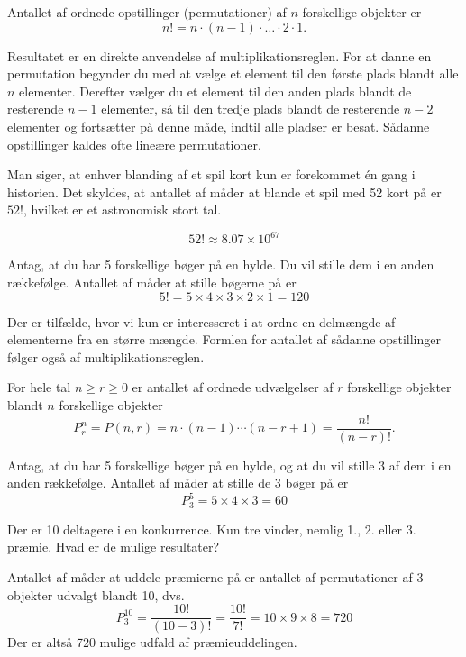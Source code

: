 \begin{proposition}
    Antallet af ordnede opstillinger (permutationer) af $n$ forskellige objekter er
    \[
    n! = n \cdot (n-1) \cdot \dots \cdot 2 \cdot 1.
    \]
\end{proposition}

Resultatet er en direkte anvendelse af multiplikationsreglen. For at danne en permutation begynder du med at vælge et element til den første plads blandt alle $n$ elementer. Derefter vælger du et element til den anden plads blandt de resterende $n-1$ elementer, så til den tredje plads blandt de resterende $n-2$ elementer og fortsætter på denne måde, indtil alle pladser er besat. Sådanne opstillinger kaldes ofte lineære permutationer.

\begin{example}
    Man siger, at enhver blanding af et spil kort kun er forekommet én gang i historien. Det skyldes, at antallet af måder at blande et spil med 52 kort på er \(52!\), hvilket er et astronomisk stort tal.

    \[52! \approx 8.07 \times 10^{67}\]
\end{example}

\begin{example}
    Antag, at du har 5 forskellige bøger på en hylde. Du vil stille dem i en anden rækkefølge. Antallet af måder at stille bøgerne på er
    \[5! = 5 \times 4 \times 3 \times 2 \times 1 = 120\]
\end{example}

Der er tilfælde, hvor vi kun er interesseret i at ordne en delmængde af elementerne fra en større mængde. Formlen for antallet af sådanne opstillinger følger også af multiplikationsreglen.

\begin{theorem}
    For hele tal $n \ge r \ge 0$ er antallet af ordnede udvælgelser af $r$ forskellige objekter blandt $n$ forskellige objekter
    \[
    P_r^n = P(n,r) = n \cdot (n-1) \cdots (n-r+1) = \frac{n!}{(n-r)!}.
    \]
\end{theorem}

\begin{example}
    Antag, at du har 5 forskellige bøger på en hylde, og at du vil stille 3 af dem i en anden rækkefølge. Antallet af måder at stille de 3 bøger på er
    \[
    P_3^5=5 \times 4 \times 3 = 60
    \]
\end{example}

\begin{example}
    Der er 10 deltagere i en konkurrence. Kun tre vinder, nemlig 1., 2. eller 3. præmie. Hvad er de mulige resultater?
\end{example}
\begin{solution}
    Antallet af måder at uddele præmierne på er antallet af permutationer af 3 objekter udvalgt blandt 10, dvs.
    \[
    P_3^{10}= \frac{10!}{(10-3)!}=\frac{10!}{7!} = 10 \times 9 \times 8 = 720
    \]
    Der er altså 720 mulige udfald af præmieuddelingen.
\end{solution}

